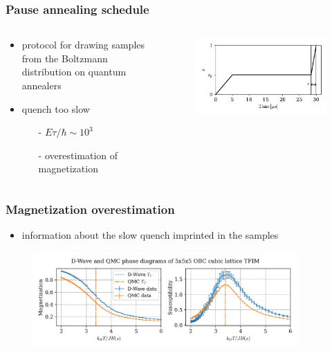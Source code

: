 \documentclass[11pt]{beamer}
\newcommand{\itemb}{\item[$\bullet$]}
\begin{document}
\begin{frame}
    \frametitle{Pause annealing schedule}    
    \begin{columns}[T]
        \begin{column}{0.45\textwidth}
            \begin{itemize}
                \itemb protocol for drawing samples from the Boltzmann distribution on quantum annealers
                \itemb quench too slow
                \begin{itemize}
                    \item [-] $E \tau / \hbar \sim 10^3$
                    \item [-] overestimation of magnetization
                \end{itemize}
            \end{itemize}
        \end{column}
        \begin{column}{0.55\textwidth}
            \begin{figure}[!htb]
                \centering
                \includegraphics[width=\textwidth]{../plots/pause_schedule.pdf}        
            \end{figure}
        \end{column}
    \end{columns}
\end{frame}

\begin{frame}
    \frametitle{Magnetization overestimation}
    \begin{itemize}
        \setlength{\itemindent}{-1em}
        \itemb information about the slow quench imprinted in the samples
    \end{itemize} 
    \begin{figure}[!htb]
        \centering
        \includegraphics[width=0.9\textwidth]{../plots/dwave_vs_mcmc-5x5x5_gamma2.png}
    \end{figure}
\end{frame}
\end{document}

